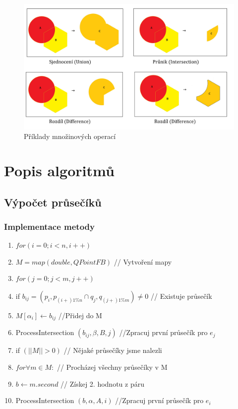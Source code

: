 \documentclass[a4paper, 12pt]{article}
\begin{document}
\begin{figure}[h]
	\centering
	\includegraphics[width=18cm]{BO.jpg}
	\caption{Příklady množinových operací}
\end{figure}


\clearpage
\section{Popis algoritmů}

\subsection{Výpočet průsečíků}

\subsubsection{Implementace metody}
\begin{enumerate}
\item $ for (i = 0; i < n, i++) $ 
\item \hspace {1cm} $ M = map (double, QPointFB) $ // Vytvoření mapy 
\item \hspace {1cm} $ for (j = 0; j < m, j++) $
\item \hspace {2cm} if $ b_{ij} = (p_i, p_{(i+)1\%n} \cap q_j, q_{(j+)1\%m }) \neq 0$ // Existuje průsečík
\item \hspace {3cm} $ M [\alpha_i] \longleftarrow b_{ij}$ //Přidej do M
\item \hspace {3cm} ProcessIntersection $ (b_{ij}, \beta, B, j) $ //Zpracuj první průsečík pro $ e_j $
\item \hspace {1cm} if $(||M|| > 0)$ // Nějaké průsečíky jsme nalezli
\item \hspace{2cm} $  for \forall m \in M: $ // Procházej všechny průsečíky v M
\item  \hspace{3cm} $ b \longleftarrow m.second $ // Získej 2. hodnotu z páru
\item \hspace{3cm} ProcessIntersection $ (b, \alpha, A, i) $ //Zpracuj první průsečík pro $ e_i $
\end{enumerate}
\end{document}
